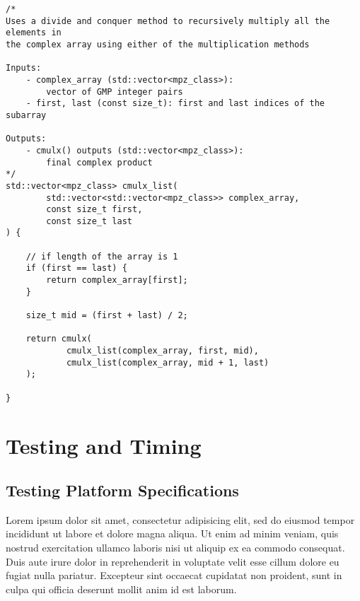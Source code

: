 \documentclass[usletter, 12pt]{article}
\begin{document}
\begin{lstlisting}
/*
Uses a divide and conquer method to recursively multiply all the elements in
the complex array using either of the multiplication methods

Inputs:
    - complex_array (std::vector<mpz_class>):
        vector of GMP integer pairs
    - first, last (const size_t): first and last indices of the subarray

Outputs:
    - cmulx() outputs (std::vector<mpz_class>):
        final complex product
*/
std::vector<mpz_class> cmulx_list(
        std::vector<std::vector<mpz_class>> complex_array,
        const size_t first,
        const size_t last
) {

    // if length of the array is 1
    if (first == last) {
        return complex_array[first];
    }

    size_t mid = (first + last) / 2;

    return cmulx(
            cmulx_list(complex_array, first, mid),
            cmulx_list(complex_array, mid + 1, last)
    );

}
\end{lstlisting}


    \section{Testing and Timing}
        \subsection{Testing Platform Specifications}

        Lorem ipsum dolor sit amet, consectetur adipisicing elit, sed do eiusmod
        tempor incididunt ut labore et dolore magna aliqua. Ut enim ad minim veniam,
        quis nostrud exercitation ullamco laboris nisi ut aliquip ex ea commodo
        consequat. Duis aute irure dolor in reprehenderit in voluptate velit esse
        cillum dolore eu fugiat nulla pariatur. Excepteur sint occaecat cupidatat non
        proident, sunt in culpa qui officia deserunt mollit anim id est laborum.
\end{document}
